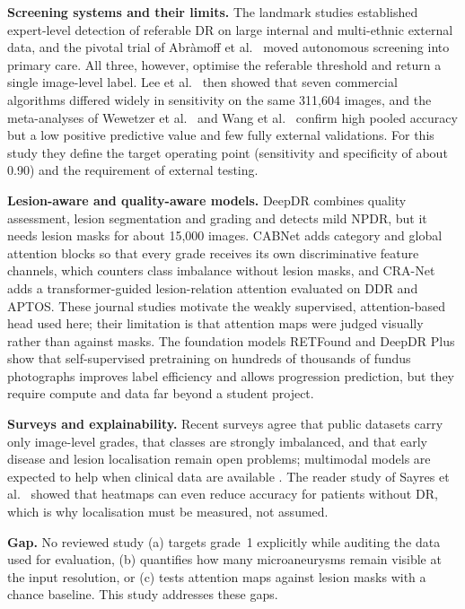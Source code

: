 \textbf{Screening systems and their limits.} The landmark studies \cite{gulshan2016,ting2017} established expert-level detection of referable DR on large internal and multi-ethnic external data, and the pivotal trial of Abr\`amoff et al.\ \cite{abramoff2018} moved autonomous screening into primary care. All three, however, optimise the referable threshold and return a single image-level label. Lee et al.\ \cite{lee2021} then showed that seven commercial algorithms differed widely in sensitivity on the same 311{,}604 images, and the meta-analyses of Wewetzer et al.\ \cite{wewetzer2021} and Wang et al.\ \cite{wang2026} confirm high pooled accuracy but a low positive predictive value and few fully external validations. For this study they define the target operating point (sensitivity and specificity of about 0.90) and the requirement of external testing.

\textbf{Lesion-aware and quality-aware models.} DeepDR \cite{dai2021} combines quality assessment, lesion segmentation and grading and detects mild NPDR, but it needs lesion masks for about 15{,}000 images. CABNet \cite{he2021} adds category and global attention blocks so that every grade receives its own discriminative feature channels, which counters class imbalance without lesion masks, and CRA-Net \cite{ma2024} adds a transformer-guided lesion-relation attention evaluated on DDR and APTOS. These journal studies motivate the weakly supervised, attention-based head used here; their limitation is that attention maps were judged visually rather than against masks. The foundation models RETFound \cite{zhou2023} and DeepDR Plus \cite{dai2024} show that self-supervised pretraining on hundreds of thousands of fundus photographs improves label efficiency and allows progression prediction, but they require compute and data far beyond a student project.

\textbf{Surveys and explainability.} Recent surveys \cite{tsiknakis2021,bhulakshmi2024} agree that public datasets carry only image-level grades, that classes are strongly imbalanced, and that early disease and lesion localisation remain open problems; multimodal models are expected to help when clinical data are available \cite{qin2026}. The reader study of Sayres et al.\ \cite{sayres2019} showed that heatmaps can even reduce accuracy for patients without DR, which is why localisation must be measured, not assumed.

\textbf{Gap.} No reviewed study (a) targets grade~1 explicitly while auditing the data used for evaluation, (b) quantifies how many microaneurysms remain visible at the input resolution, or (c) tests attention maps against lesion masks with a chance baseline. This study addresses these gaps.

